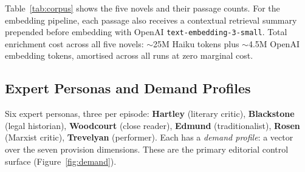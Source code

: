 \documentclass[final]{clv2025}
\begin{document}
Table~\ref{tab:corpus} shows the five novels and their passage counts.
For the embedding pipeline, each passage also receives a contextual
retrieval summary \citep{anthropic2024context} prepended before
embedding with OpenAI \texttt{text-embedding-3-small}.  Total
enrichment cost across all five novels: ${\sim}$25M Haiku tokens plus
${\sim}$4.5M OpenAI embedding tokens, amortised across all runs at zero
marginal cost.


\subsection{Expert Personas and Demand Profiles}
\label{sec:personas}

Six expert personas, three per episode: \textbf{Hartley} (literary
critic), \textbf{Blackstone} (legal historian), \textbf{Woodcourt}
(close reader), \textbf{Edmund} (traditionalist), \textbf{Rosen}
(Marxist critic), \textbf{Trevelyan} (performer).  Each has a
\emph{demand profile}: a vector over the seven provision dimensions.
These are the primary editorial control surface
(Figure~\ref{fig:demand}).
\end{document}

